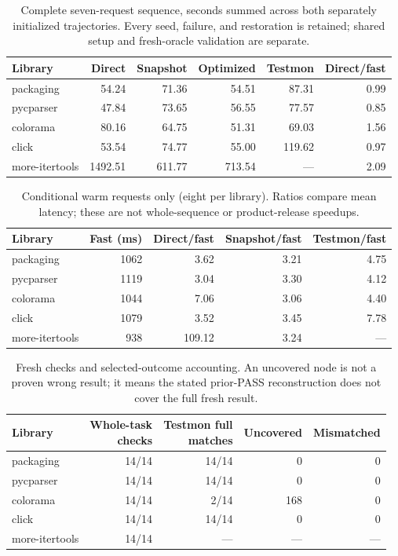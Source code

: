 \begin{table}[htbp]
\caption{Complete seven-request sequence, seconds summed across both separately initialized trajectories. Every seed, failure, and restoration is retained; shared setup and fresh-oracle validation are separate.}\label{tab:sequence}
\small
\begin{tabular}{@{}lrrrrr@{}}
\toprule
Library & Direct & Snapshot & Optimized & Testmon & Direct/fast \\
\midrule
packaging & 54.24 & 71.36 & 54.51 & 87.31 & 0.99 \\
pycparser & 47.84 & 73.65 & 56.55 & 77.57 & 0.85 \\
colorama & 80.16 & 64.75 & 51.31 & 69.03 & 1.56 \\
click & 53.54 & 74.77 & 55.00 & 119.62 & 0.97 \\
more-itertools & 1492.51 & 611.77 & 713.54 & --- & 2.09 \\
\bottomrule
\end{tabular}
\end{table}

\begin{table}[htbp]
\caption{Conditional warm requests only (eight per library). Ratios compare mean latency; these are not whole-sequence or product-release speedups.}\label{tab:warm}
\small
\begin{tabular}{@{}lrrrr@{}}
\toprule
Library & Fast (ms) & Direct/fast & Snapshot/fast & Testmon/fast \\
\midrule
packaging & 1062 & 3.62 & 3.21 & 4.75 \\
pycparser & 1119 & 3.04 & 3.30 & 4.12 \\
colorama & 1044 & 7.06 & 3.06 & 4.40 \\
click & 1079 & 3.52 & 3.45 & 7.78 \\
more-itertools & 938 & 109.12 & 3.24 & --- \\
\bottomrule
\end{tabular}
\end{table}

\begin{table}[htbp]
\caption{Fresh checks and selected-outcome accounting. An uncovered node is not a proven wrong result; it means the stated prior-PASS reconstruction does not cover the full fresh result.}\label{tab:agreement}
\small
\begin{tabular}{@{}lrrrr@{}}
\toprule
Library & \shortstack{Whole-task\\checks} & \shortstack{Testmon full\\matches} & Uncovered & Mismatched \\
\midrule
packaging & 14/14 & 14/14 & 0 & 0 \\
pycparser & 14/14 & 14/14 & 0 & 0 \\
colorama & 14/14 & 2/14 & 168 & 0 \\
click & 14/14 & 14/14 & 0 & 0 \\
more-itertools & 14/14 & --- & --- & --- \\
\bottomrule
\end{tabular}
\end{table}

